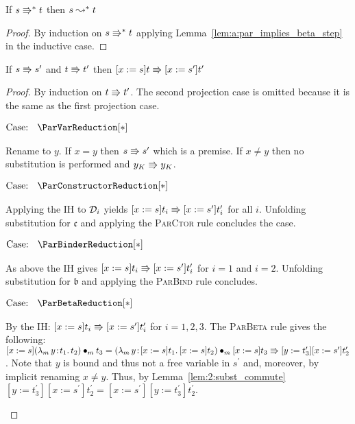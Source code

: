 \begin{lemma}
    If $s \Rrightarrow^* t$ then $s \leadsto^* t$
    \label{lem:a:par_implies_beta}
\end{lemma}
\begin{proof}
    By induction on $s \Rrightarrow^* t$ applying Lemma~\ref{lem:a:par_implies_beta_step} in the inductive case.
\end{proof}

\begin{lemma}
    If $s \Rrightarrow s^\prime$ and $t \Rrightarrow t^\prime$ then $[x := s]t \Rrightarrow [x := s^\prime]t^\prime$
    \label{lem:a:par_subst}
\end{lemma}
\begin{proof}
    By induction on $t \Rrightarrow t^\prime$.
    The second projection case is omitted because it is the same as the first projection case.

    $\text{Case: }\begin{array}{c} \ParVarReduction[*] \end{array}$
    \begin{proofcase}
        Rename to $y$.
        If $x = y$ then $s \Rrightarrow s^\prime$ which is a premise.
        If $x \neq y$ then no substitution is performed and $y_K \Rrightarrow y_K$.
    \end{proofcase}

    $\text{Case: }\begin{array}{c} \ParConstructorReduction[*] \end{array}$
    \begin{proofcase}
        Applying the IH to $\mathcal{D}_{i}$ yields $[x := s]t_i \Rrightarrow [x := s^\prime]t_i^\prime$ for all $i$.
        Unfolding substitution for $\mathfrak{c}$ and applying the \textsc{ParCtor} rule concludes the case.
    \end{proofcase}

    $\text{Case: }\begin{array}{c} \ParBinderReduction[*] \end{array}$
    \begin{proofcase}
        As above the IH gives $[x := s]t_i \Rrightarrow [x := s^\prime]t_i^\prime$ for $i = 1$ and $i = 2$.
        Unfolding substitution for $\mathfrak{b}$ and applying the \textsc{ParBind} rule concludes.
    \end{proofcase}

    $\text{Case: }\begin{array}{c} \ParBetaReduction[*] \end{array}$
    \begin{proofcase}
        By the IH: $[x := s]t_i \Rrightarrow [x := s^\prime]t_i^\prime$ for $i = 1, 2, 3$.
        The \textsc{ParBeta} rule gives the following:
        $[x := s]({\lambda_m}\, y\! : \! t_1.\, t_2) \bullet_{m} t_3 = ({\lambda_m}\, y\! : \! [x := s]t_1.\, [x := s]t_2) \bullet_{m} [x := s]t_3 \Rrightarrow [y := t_3^\prime][x := s^\prime]t_2^\prime$.
        Note that $y$ is bound and thus not a free variable in $s^\prime$ and, moreover, by implicit renaming $x \neq y$.
        Thus, by Lemma~\ref{lem:2:subst_commute} $[y := t_3^\prime][x := s^\prime]t_2^\prime = [x := s^\prime][y := t_3^\prime]t_2^\prime$.
    \end{proofcase}


\end{proof}
